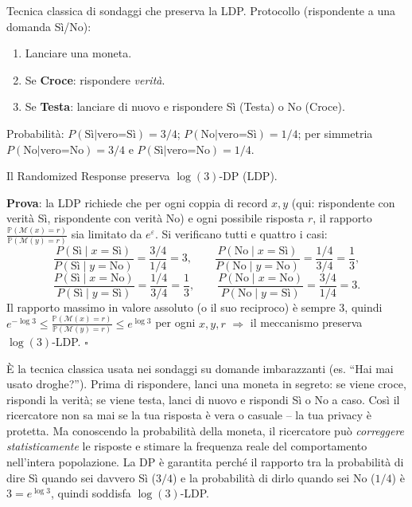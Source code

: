 \documentclass[a4paper,11pt]{article}
\begin{document}
\begin{definizione}
Tecnica classica di sondaggi che preserva la LDP. Protocollo (rispondente a una domanda S\`{i}/No):
\begin{enumerate}
  \item Lanciare una moneta.
  \item Se \textbf{Croce}: rispondere \emph{verit\`{a}}.
  \item Se \textbf{Testa}: lanciare di nuovo e rispondere S\`{i} (Testa) o No (Croce).
\end{enumerate}
Probabilit\`{a}: $P(\text{Sì}|\text{vero=Sì}) = 3/4$; $P(\text{No}|\text{vero=Sì}) = 1/4$; per simmetria $P(\text{No}|\text{vero=No}) = 3/4$ e $P(\text{Sì}|\text{vero=No}) = 1/4$.

Il Randomized Response preserva $\log(3)$-DP (LDP).

\textbf{Prova}: la LDP richiede che per ogni coppia di record $x, y$ (qui: rispondente con verit\`{a} S\`{i}, rispondente con verit\`{a} No) e ogni possibile risposta $r$, il rapporto $\frac{\mathbb{P}(\mathcal{M}(x)=r)}{\mathbb{P}(\mathcal{M}(y)=r)}$ sia limitato da $e^\varepsilon$. Si verificano tutti e quattro i casi:
\[
\frac{P(\text{Sì}\mid x=\text{Sì})}{P(\text{Sì}\mid y=\text{No})} = \frac{3/4}{1/4} = 3, \qquad
\frac{P(\text{No}\mid x=\text{Sì})}{P(\text{No}\mid y=\text{No})} = \frac{1/4}{3/4} = \frac{1}{3},
\]
\[
\frac{P(\text{Sì}\mid x=\text{No})}{P(\text{Sì}\mid y=\text{Sì})} = \frac{1/4}{3/4} = \frac{1}{3}, \qquad
\frac{P(\text{No}\mid x=\text{No})}{P(\text{No}\mid y=\text{Sì})} = \frac{3/4}{1/4} = 3.
\]
Il rapporto massimo in valore assoluto (o il suo reciproco) \`{e} sempre $3$, quindi $e^{-\log 3} \leq \frac{\mathbb{P}(\mathcal{M}(x)=r)}{\mathbb{P}(\mathcal{M}(y)=r)} \leq e^{\log 3}$ per ogni $x,y,r$ $\Rightarrow$ il meccanismo preserva $\log(3)$-LDP. $\square$
\end{definizione}

\begin{nota}
È la tecnica classica usata nei sondaggi su domande imbarazzanti (es. ``Hai mai usato droghe?''). Prima di rispondere, lanci una moneta in segreto: se viene croce, rispondi la verità; se viene testa, lanci di nuovo e rispondi Sì o No a caso. Così il ricercatore non sa mai se la tua risposta è vera o casuale -- la tua privacy è protetta. Ma conoscendo la probabilità della moneta, il ricercatore può \emph{correggere statisticamente} le risposte e stimare la frequenza reale del comportamento nell'intera popolazione. La DP è garantita perché il rapporto tra la probabilità di dire Sì quando sei davvero Sì ($3/4$) e la probabilità di dirlo quando sei No ($1/4$) è $3 = e^{\log 3}$, quindi soddisfa $\log(3)$-LDP.
\end{nota}
\end{document}

